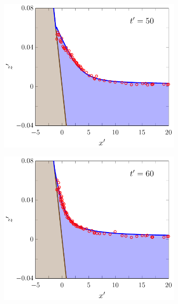 \documentclass[times]{elsarticle}
\begin{document}
\begin{figure}
\begin{subfigure}{0.5\textwidth}
	\end{subfigure}
	\begin{subfigure}{0.5\textwidth}
		\includegraphics[width=\textwidth]{./Figures/Experimental/Synolakis/nonbreaking/50s.pdf}
		\vspace{0.5cm}
	\end{subfigure}%
	\begin{subfigure}{0.5\textwidth}
		\includegraphics[width=\textwidth]{./Figures/Experimental/Synolakis/nonbreaking/60s.pdf}
		\vspace{0.5cm}

\end{subfigure}
\end{figure}
\end{document}
